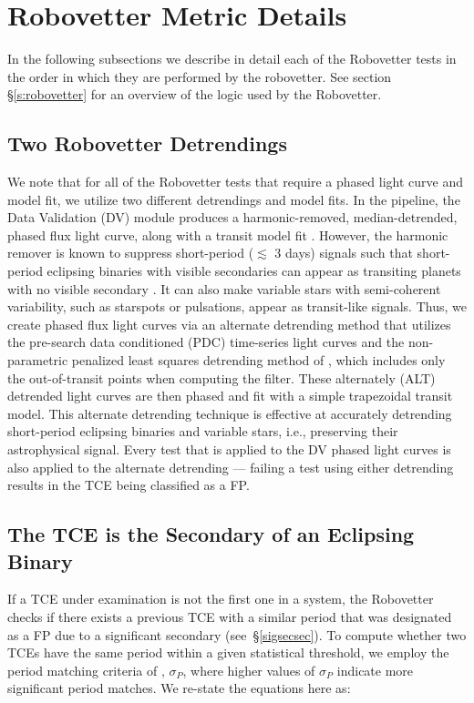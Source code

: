 \section{Robovetter Metric Details}
\label{s:metrics}
In the following subsections we describe in detail each of the Robovetter tests in the order in which they are performed by the robovetter. See section \S\ref{s:robovetter} for an overview of the logic used by the Robovetter.

\subsection{Two Robovetter Detrendings}
We note that for all of the Robovetter tests that require a phased light curve and model fit, we utilize two different detrendings and model fits. In the \kepler{} pipeline, the Data Validation (DV) module produces a harmonic-removed, median-detrended, phased flux light curve, along with a transit model fit \citep{Wu2010}. However, the harmonic remover is known to suppress short-period ($\lesssim$ 3 days) signals such that short-period eclipsing binaries with visible secondaries can appear as transiting planets with no visible secondary \citep{Christiansen2013b}. It can also make variable stars with semi-coherent variability, such as starspots or pulsations, appear as transit-like signals. Thus, we create phased flux light curves via an alternate detrending method that utilizes the pre-search data conditioned (PDC) time-series light curves and the non-parametric penalized least squares detrending method of \citet{Garcia2010}, which includes only the out-of-transit points when computing the filter. These alternately (ALT) detrended light curves are then phased and fit with a simple trapezoidal transit model. This alternate detrending technique is effective at accurately detrending short-period eclipsing binaries and variable stars, i.e., preserving their astrophysical signal. Every test that is applied to the DV phased light curves is also applied to the alternate detrending --- failing a test using either detrending results in the TCE being classified as a FP.


\subsection{The TCE is the Secondary of an Eclipsing Binary}
\label{s:issecond}
If a TCE under examination is not the first one in a system, the Robovetter checks if there exists a previous TCE with a similar period that was designated as a FP due to a significant secondary (see~\S\ref{sigsecsec}). To compute whether two TCEs have the same period within a given statistical threshold, we employ the period matching criteria of \citet[][see equations 1-3]{Coughlin2014a}, $\sigma_{P}$, where higher values of $\sigma_{P}$ indicate more significant period matches. We re-state the equations here as:


